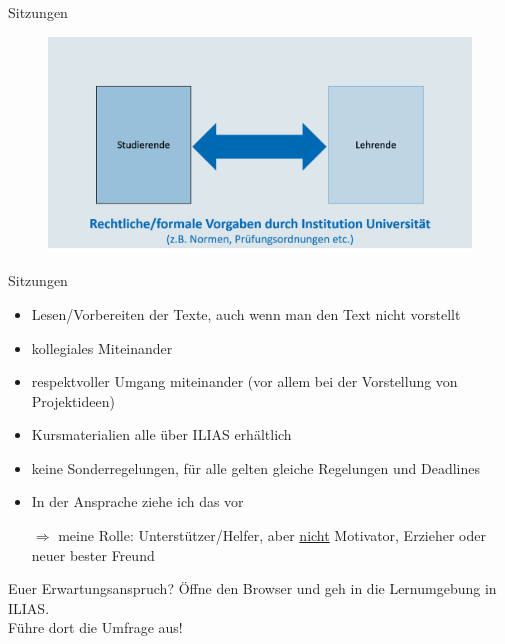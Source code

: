 \documentclass[11pt]{beamer}
\begin{document}
\begin{frame}[t]{Sitzungen}
	\begin{center}
		\begin{figure}[ht]
			\includegraphics[width=\textwidth]{pics/pre7.png}
		\end{figure}	
	\end{center}
\end{frame}

\begin{frame}[t]{Sitzungen}

	\begin{itemize}
		\item Lesen/Vorbereiten der Texte, auch wenn man den Text nicht vorstellt
		\item kollegiales Miteinander
		\item respektvoller Umgang miteinander (vor allem bei der Vorstellung von Projektideen)
		\item Kursmaterialien alle über ILIAS erhältlich
		\item keine Sonderregelungen, für alle gelten gleiche Regelungen und Deadlines
		\item In der Ansprache ziehe ich das  vor
		\item[$\Rightarrow$] meine Rolle: Unterstützer/Helfer, aber \underline{nicht} Motivator, Erzieher oder neuer bester Freund
	\end{itemize}
\end{frame}

\begin{frame}[t]{Euer Erwartungsanspruch?}
Öffne den Browser und geh in die Lernumgebung in ILIAS. \\

Führe dort die Umfrage aus!
\end{frame}
\end{document}
